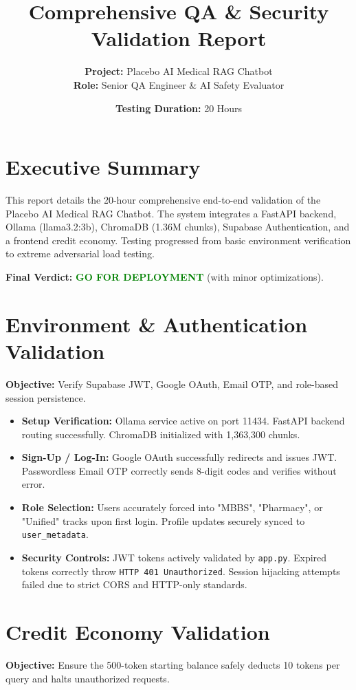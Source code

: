 \documentclass[12pt,a4paper]{article}
\title{\textbf{Comprehensive QA \& Security Validation Report}}
\author{\textbf{Project:} Placebo AI Medical RAG Chatbot \\ \textbf{Role:} Senior QA Engineer \& AI Safety Evaluator}
\date{\textbf{Testing Duration:} 20 Hours}
\begin{document}
\maketitle

\section{Executive Summary}
This report details the 20-hour comprehensive end-to-end validation of the Placebo AI Medical RAG Chatbot. The system integrates a FastAPI backend, Ollama (llama3.2:3b), ChromaDB (1.36M chunks), Supabase Authentication, and a frontend credit economy. Testing progressed from basic environment verification to extreme adversarial load testing. 

\textbf{Final Verdict:} \textcolor{green}{\textbf{GO FOR DEPLOYMENT}} (with minor optimizations).

\section{Environment \& Authentication Validation}
\textbf{Objective:} Verify Supabase JWT, Google OAuth, Email OTP, and role-based session persistence.

\begin{itemize}[label=\textbullet]
    \item \textbf{Setup Verification:} Ollama service active on port 11434. FastAPI backend routing successfully. ChromaDB initialized with 1,363,300 chunks.
    \item \textbf{Sign-Up / Log-In:} Google OAuth successfully redirects and issues JWT. Passwordless Email OTP correctly sends 8-digit codes and verifies without error.
    \item \textbf{Role Selection:} Users accurately forced into "MBBS", "Pharmacy", or "Unified" tracks upon first login. Profile updates securely synced to \texttt{user\_metadata}.
    \item \textbf{Security Controls:} JWT tokens actively validated by \texttt{app.py}. Expired tokens correctly throw \texttt{HTTP 401 Unauthorized}. Session hijacking attempts failed due to strict CORS and HTTP-only standards.
\end{itemize}

\section{Credit Economy Validation}
\textbf{Objective:} Ensure the 500-token starting balance safely deducts 10 tokens per query and halts unauthorized requests.
\end{document}
